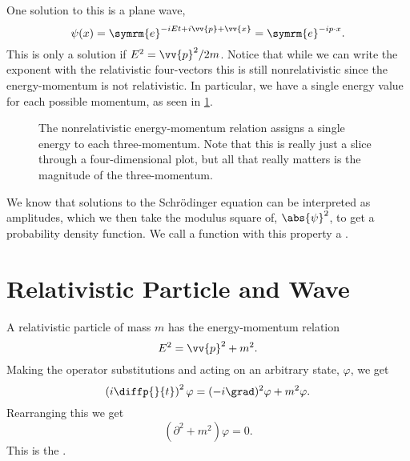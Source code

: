 \documentclass[fleqn]{NotesClass}
\newcommand{\dalembertian}{\partial^2}
\newcommand{\e}{\symrm{e}}
\begin{document}
    One solution to this is a plane wave,
    \begin{equation}
        \psi(x) = \e^{-iEt + i\vv{p} + \vv{x}} = \e^{-ip\cdot x}.
    \end{equation}
    This is only a solution if \(E^2 = \vv{p}^2/2m\).
    Notice that while we can write the exponent with the relativistic four-vectors this is still nonrelativistic since the energy-momentum is not relativistic.
    In particular, we have a single energy value for each possible momentum, as seen in \cref{fig:energy-momentum relation nonrelativistic}.
    
    \begin{figure}
        \caption{The nonrelativistic energy-momentum relation assigns a single energy to each three-momentum. Note that this is really just a slice through a four-dimensional plot, but all that really matters is the magnitude of the three-momentum.}
        \label{fig:energy-momentum relation nonrelativistic}
    \end{figure}
    
    We know that solutions to the Schrödinger equation can be interpreted as amplitudes, which we then take the modulus square of, \(\abs{\psi}^2\), to get a probability density function.
    We call a function with this property a .
    
    \section{Relativistic Particle and Wave}
    A relativistic particle of mass \(m\) has the energy-momentum relation
    \begin{equation}
        E^2 = \vv{p}^2 + m^2.
    \end{equation}
    Making the operator substitutions and acting on an arbitrary state, \(\varphi\), we get
    \begin{equation}
        \left( i\diffp{}{t} \right)^2\varphi = (-i\grad)^2\varphi + m^2\varphi.
    \end{equation}
    Rearranging this we get
    \begin{equation}
        (\dalembertian + m^2)\varphi = 0.
    \end{equation}
    This is the .
    
\end{document}
